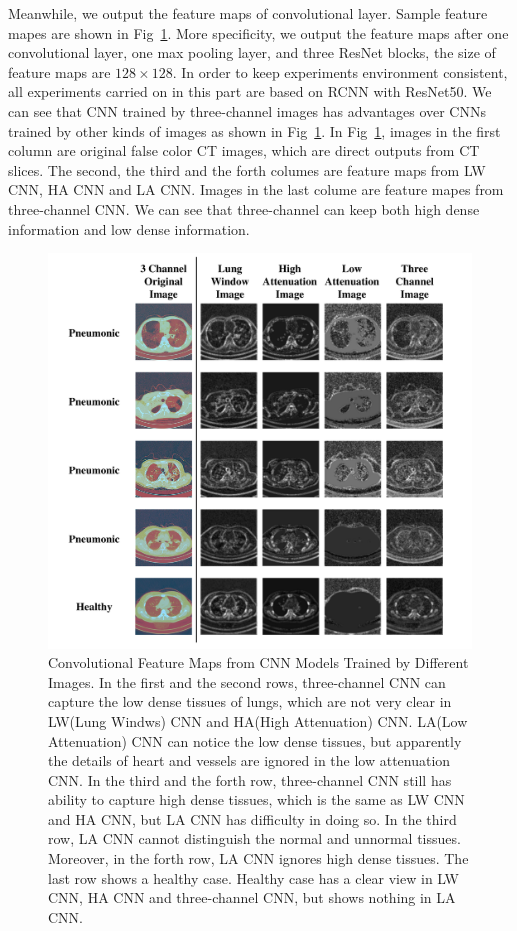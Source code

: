 \documentclass[journal]{IEEEtran}
\begin{document}
Meanwhile, we output the feature maps of convolutional layer. Sample feature mapes are shown in Fig~\ref{show}. More specificity, we output the feature maps after one convolutional layer, one max pooling layer, and three ResNet blocks, the size of feature maps are $128 \times 128$. In order to keep experiments environment consistent, all experiments carried on in this part are based on RCNN with ResNet50. We can see that CNN trained by three-channel images has advantages over CNNs trained by other kinds of images as shown in Fig~\ref{show}. 
In Fig~\ref{show}, images in the first column are original false color CT images, which are direct outputs from CT slices. The second, the third and the forth columes are feature maps from LW CNN, HA CNN and LA CNN. Images in the last colume are feature mapes from three-channel CNN. We can see that three-channel can keep both high dense information and low dense information. 


\begin{figure}[t]
\centerline{\includegraphics[width=150mm]{show.pdf}}
\vspace{-0cm}
\caption{Convolutional Feature Maps from CNN Models Trained by Different Images. In the first and the second rows, three-channel CNN can capture the low dense tissues of lungs, which are not very clear in LW(Lung Windws) CNN and HA(High Attenuation) CNN. LA(Low Attenuation) CNN can notice the low dense tissues, but apparently the details of heart and vessels are ignored in the low attenuation CNN. 
In the third and the forth row, three-channel CNN still has ability to capture high dense tissues, which is the same as LW CNN and HA CNN, but LA CNN has difficulty in doing so. In the third row, LA CNN cannot distinguish the normal and unnormal tissues. Moreover, in the forth row, LA CNN ignores high dense tissues. The last row shows a healthy case. Healthy case has a clear view in LW CNN, HA CNN and three-channel CNN, but shows nothing in LA CNN.}
\vspace{-0cm}
\label{show}
\end{figure}
\end{document}

